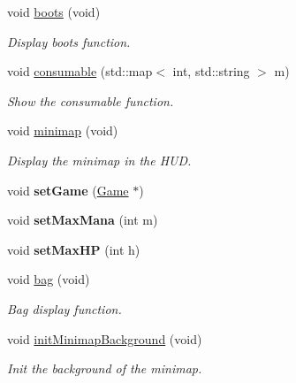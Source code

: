 \begin{DoxyCompactItemize}
void \hyperlink{class_h_u_d_window_acd4fdbfd1c2562384b84d3bcda80fea1}{boots} (void)
\begin{DoxyCompactList}\small\item\em Display boots function. \end{DoxyCompactList}\item 
void \hyperlink{class_h_u_d_window_aeeafdcca95bdcdb3b31a6bc4d2e1e379}{consumable} (std\+::map$<$ int, std\+::string $>$ m)
\begin{DoxyCompactList}\small\item\em Show the consumable function. \end{DoxyCompactList}\item 
void \hyperlink{class_h_u_d_window_a8264836f3c55d8211f4e5166e9049628}{minimap} (void)
\begin{DoxyCompactList}\small\item\em Display the minimap in the H\+U\+D. \end{DoxyCompactList}\item 
\hypertarget{class_h_u_d_window_a5baefc7b585437df2639fda359c3cf46}{void {\bfseries set\+Game} (\hyperlink{class_game}{Game} $\ast$)}\label{class_h_u_d_window_a5baefc7b585437df2639fda359c3cf46}

\item 
\hypertarget{class_h_u_d_window_a58ab83987f850c631909aa77af050423}{void {\bfseries set\+Max\+Mana} (int m)}\label{class_h_u_d_window_a58ab83987f850c631909aa77af050423}

\item 
\hypertarget{class_h_u_d_window_a1bc77dc304a6cac0a06ffb35040ba61d}{void {\bfseries set\+Max\+H\+P} (int h)}\label{class_h_u_d_window_a1bc77dc304a6cac0a06ffb35040ba61d}

\item 
void \hyperlink{class_h_u_d_window_a072650c8490c0222c95b7ff99efb4924}{bag} (void)
\begin{DoxyCompactList}\small\item\em Bag display function. \end{DoxyCompactList}\item 
\hypertarget{class_h_u_d_window_a30c4372e58de0f8615e772d9809a2664}{void \hyperlink{class_h_u_d_window_a30c4372e58de0f8615e772d9809a2664}{init\+Minimap\+Background} (void)}\label{class_h_u_d_window_a30c4372e58de0f8615e772d9809a2664}

\begin{DoxyCompactList}\small\item\em Init the background of the minimap. \end{DoxyCompactList}\end{DoxyCompactItemize}


